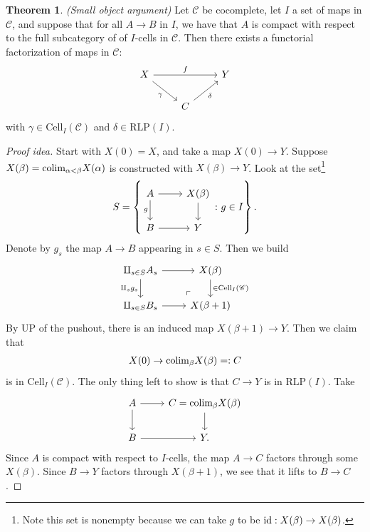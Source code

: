 \documentclass[12pt]{amsart}
\theoremstyle{definition}
\newtheorem{theorem}{Theorem}[section]
\providecommand{\RLP}{\text{RLP}}
\providecommand{\Cell}{\text{Cell}}
\begin{document}
\begin{theorem} \textit{(Small object argument)} Let $\mathscr{C}$ be cocomplete, let $I$ a set of maps in $\mathscr{C}$, and suppose that for all $A\to B$ in $I$, we have that $A$ is compact with respect to the full subcategory of of $I$-cells in $\mathscr{C}$. Then there exists a functorial factorization of maps in $\mathscr{C}$:
\[ \begin{tikzcd}
    X\ar[rr,"f"]\ar[dr,"\gamma" below left] &  & Y\\
     & C\ar[ur,"\delta" below right] & 
\end{tikzcd} \]
with $\gamma \in \Cell_I(\mathscr{C})$ and $\delta \in \RLP(I)$.
\end{theorem}
\begin{proof}[Proof idea] Start with $X(0) = X$, and take a map $X(0) \to Y$. Suppose $X(\beta) = \text{colim}_{\alpha<\beta} X(\alpha)$ is constructed with $X(\beta) \to Y$. Look at the set\footnote{Note this set is nonempty because we can take $g$ to be $\text{id}: X(\beta) \to X(\beta)$.}
\begin{align*}
    S = \left\{ 
\begin{tikzcd}[ampersand replacement=\&]
    A\rar\dar["g" left] \& X(\beta)\dar\\
    B\rar \& Y
\end{tikzcd} \colon g\in I
    \right\}.
\end{align*}
Denote by $g_s$ the map $A \to B$ appearing in $s\in S$. Then we build
\[ \begin{tikzcd}
    \amalg_{s\in S} A_s\rar\dar["\amalg_s g_s" left] & X(\beta)\dar["\in\Cell_I(\mathscr{C})"]\\
    \amalg_{s\in S} B_s \rar & X(\beta+1)\po
\end{tikzcd} \]
By UP of the pushout, there is an induced map $X(\beta+1) \to Y$. Then we claim that
\begin{align*}
    X(0) \to \text{colim}_\beta X(\beta) =:C
\end{align*}
is in $\Cell_I(\mathscr{C})$. The only thing left to show is that $C \to Y$ is in $\RLP(I)$. Take
\[ \begin{tikzcd}
    A\rar\dar & C = \colim_\beta X(\beta)\dar\\
    B\rar & Y.
\end{tikzcd} \]
Since $A$ is compact with respect to $I$-cells, the map $A \to C$ factors through some $X(\beta)$. Since $B \to Y$ factors through $X(\beta+1)$, we see that it lifts to $B \to C$.
\end{proof}
\end{document}
